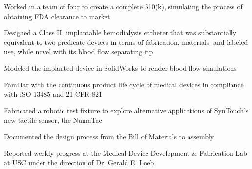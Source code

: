 \documentclass[letterpaper]{deedy-resume} %
\begin{document}
\begin{minipage}[t]{0.66\textwidth}
\sectionspace



\begin{tightitemize}
\item Worked in a team of four to create a complete 510(k), simulating the process of obtaining FDA clearance to market
\item Designed a Class II, implantable hemodialysis catheter that was substantially equivalent to two predicate devices in terms of fabrication, materials, and labeled use, while novel with its blood flow separating tip 
\item Modeled the implanted device in SolidWorks to render blood flow simulations 
\item Familiar with the continuous product life cycle of medical devices in compliance with ISO 13485 and 21 CFR 821
\end{tightitemize}

\sectionspace %



\begin{tightitemize}
\item Fabricated a robotic test fixture to explore alternative applications of SynTouch's new tactile sensor, the NumaTac
\item Documented the design process from the Bill of Materials to assembly
\item Reported weekly progress at the Medical Device Development \& Fabrication Lab at USC under the direction of Dr. Gerald E. Loeb 
\end{tightitemize}



\end{minipage} %



\end{document}
